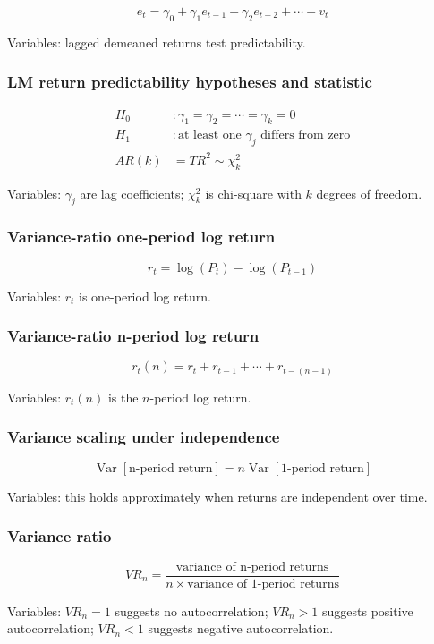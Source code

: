 \documentclass[
  8pt,
  twocolumn]{extarticle}
\begin{document}
\[
e_t=\gamma_0+\gamma_1e_{t-1}+\gamma_2e_{t-2}+\cdots+v_t
\]

Variables: lagged demeaned returns test predictability.

\subsubsection{LM return predictability hypotheses and
statistic}\label{lm-return-predictability-hypotheses-and-statistic}

\[
\begin{aligned}
H_0&:\gamma_1=\gamma_2=\cdots=\gamma_k=0\\
H_1&:\text{at least one }\gamma_j\text{ differs from zero}\\
AR(k)&=TR^2\sim\chi_k^2
\end{aligned}
\]

Variables: \(\gamma_j\) are lag coefficients; \(\chi_k^2\) is chi-square
with \(k\) degrees of freedom.

\subsubsection{Variance-ratio one-period log
return}\label{variance-ratio-one-period-log-return}

\[
r_t=\log(P_t)-\log(P_{t-1})
\]

Variables: \(r_t\) is one-period log return.

\subsubsection{Variance-ratio n-period log
return}\label{variance-ratio-n-period-log-return}

\[
r_t(n)=r_t+r_{t-1}+\cdots+r_{t-(n-1)}
\]

Variables: \(r_t(n)\) is the \(n\)-period log return.

\subsubsection{Variance scaling under
independence}\label{variance-scaling-under-independence}

\[
\operatorname{Var}[\text{n-period return}]=n\operatorname{Var}[\text{1-period return}]
\]

Variables: this holds approximately when returns are independent over
time.

\subsubsection{Variance ratio}\label{variance-ratio}

\[
VR_n=\frac{\text{variance of n-period returns}}{n\times\text{variance of 1-period returns}}
\]

Variables: \(VR_n=1\) suggests no autocorrelation; \(VR_n>1\) suggests
positive autocorrelation; \(VR_n<1\) suggests negative autocorrelation.
\end{document}
